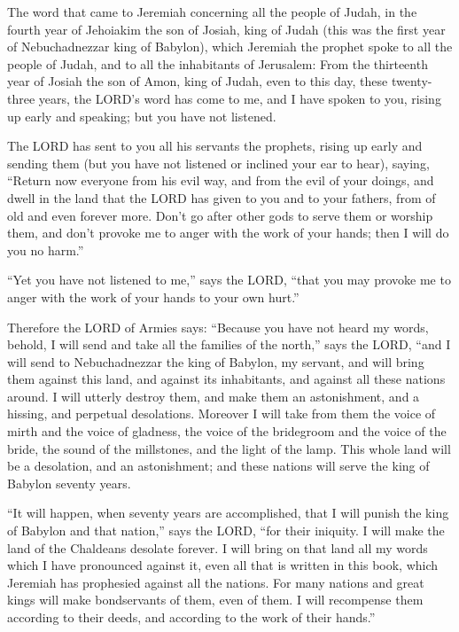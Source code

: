  The word that came to Jeremiah concerning all the people
of Judah, in the fourth year of Jehoiakim the son of Josiah, king of
Judah (this was the first year of Nebuchadnezzar king of Babylon),
 which Jeremiah the prophet spoke to all the people of
Judah, and to all the inhabitants of Jerusalem:  From the
thirteenth year of Josiah the son of Amon, king of Judah, even to this
day, these twenty-three years, the LORD's word has come to me, and I
have spoken to you, rising up early and speaking; but you have not
listened.

 The LORD has sent to you all his servants the prophets,
rising up early and sending them (but you have not listened or inclined
your ear to hear),  saying, ``Return now everyone from his
evil way, and from the evil of your doings, and dwell in the land that
the LORD has given to you and to your fathers, from of old and even
forever more.  Don't go after other gods to serve them or
worship them, and don't provoke me to anger with the work of your hands;
then I will do you no harm.''

 ``Yet you have not listened to me,'' says the LORD,
``that you may provoke me to anger with the work of your hands to your
own hurt.''

 Therefore the LORD of Armies says: ``Because you have not
heard my words,  behold, I will send and take all the
families of the north,'' says the LORD, ``and I will send to
Nebuchadnezzar the king of Babylon, my servant, and will bring them
against this land, and against its inhabitants, and against all these
nations around. I will utterly destroy them, and make them an
astonishment, and a hissing, and perpetual desolations. 
Moreover I will take from them the voice of mirth and the voice of
gladness, the voice of the bridegroom and the voice of the bride, the
sound of the millstones, and the light of the lamp.  This
whole land will be a desolation, and an astonishment; and these nations
will serve the king of Babylon seventy years.

 ``It will happen, when seventy years are accomplished,
that I will punish the king of Babylon and that nation,'' says the LORD,
``for their iniquity. I will make the land of the Chaldeans desolate
forever.  I will bring on that land all my words which I
have pronounced against it, even all that is written in this book, which
Jeremiah has prophesied against all the nations.  For
many nations and great kings will make bondservants of them, even of
them. I will recompense them according to their deeds, and according to
the work of their hands.''

